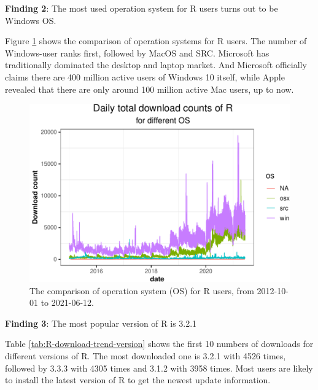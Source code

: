 \documentclass[
]{book}
\newenvironment{discovery}[1]{%
  \begin{tcolorbox}[colback=blue!30,colframe=blue!80!black]#1}{\end{tcolorbox}}
\begin{document}
\begin{discovery}
\textbf{Finding 2}: The most used operation system for R users turns out
to be Windows OS.
\end{discovery}

Figure \ref{fig:R-download-trend-os} shows the comparison of operation systems for R users. The number of Windows-user ranks first, followed by MacOS and SRC. Microsoft has traditionally dominated the desktop and laptop market. And Microsoft officially claims there are 400 million active users of Windows 10 itself, while Apple revealed that there are only around 100 million active Mac users, up to now.\citep{warren2017}



\begin{figure}

{\centering \includegraphics{figures/R-download-trend-os-1} 

}

\caption{The comparison of operation system (OS) for R users, from 2012-10-01 to 2021-06-12.}\label{fig:R-download-trend-os}
\end{figure}

\begin{discovery}
\textbf{Finding 3}: The most popular version of R is 3.2.1
\end{discovery}

Table \ref{tab:R-download-trend-version} shows the first 10 numbers of downloads for different versions of R. The most downloaded one is 3.2.1 with 4526 times, followed by 3.3.3 with 4305 times and 3.1.2 with 3958 times. Most users are likely to install the latest version of R to get the newest update information.
\end{document}

